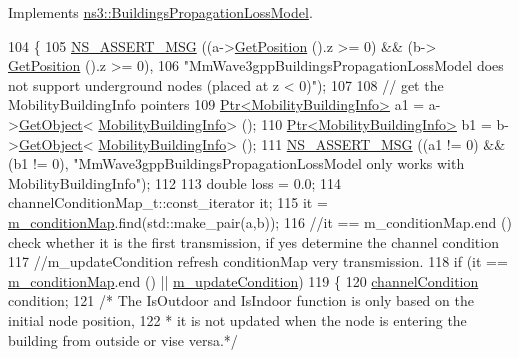 Implements \hyperlink{classns3_1_1BuildingsPropagationLossModel_a6d3a26e3118fdfd83253387f4360dc55}{ns3\+::\+Buildings\+Propagation\+Loss\+Model}.


\begin{DoxyCode}
104 \{
105         \hyperlink{assert_8h_aff5ece9066c74e681e74999856f08539}{NS\_ASSERT\_MSG} ((a->\hyperlink{classns3_1_1MobilityModel_aba838f06ec5bbb2d193d94b8c0e4abb4}{GetPosition} ().z >= 0) && (b->
      \hyperlink{classns3_1_1MobilityModel_aba838f06ec5bbb2d193d94b8c0e4abb4}{GetPosition} ().z >= 0),
106                         \textcolor{stringliteral}{"MmWave3gppBuildingsPropagationLossModel does not support underground nodes (placed
       at z < 0)"});
107 
108         \textcolor{comment}{// get the MobilityBuildingInfo pointers}
109         \hyperlink{classns3_1_1Ptr}{Ptr<MobilityBuildingInfo>} a1 = a->\hyperlink{classns3_1_1Object_a13e18c00017096c8381eb651d5bd0783}{GetObject}<
      \hyperlink{classns3_1_1MobilityBuildingInfo}{MobilityBuildingInfo}> ();
110         \hyperlink{classns3_1_1Ptr}{Ptr<MobilityBuildingInfo>} b1 = b->\hyperlink{classns3_1_1Object_a13e18c00017096c8381eb651d5bd0783}{GetObject}<
      \hyperlink{classns3_1_1MobilityBuildingInfo}{MobilityBuildingInfo}> ();
111         \hyperlink{assert_8h_aff5ece9066c74e681e74999856f08539}{NS\_ASSERT\_MSG} ((a1 != 0) && (b1 != 0), \textcolor{stringliteral}{"MmWave3gppBuildingsPropagationLossModel only
       works with MobilityBuildingInfo"});
112 
113         \textcolor{keywordtype}{double} loss = 0.0;
114         channelConditionMap\_t::const\_iterator it;
115         it = \hyperlink{classns3_1_1MmWave3gppBuildingsPropagationLossModel_a18b00c0130a2924ec13a7885543fc569}{m\_conditionMap}.find(std::make\_pair(a,b));
116         \textcolor{comment}{//it == m\_conditionMap.end () check whether it is the first transmission, if yes determine the
       channel condition}
117         \textcolor{comment}{//m\_updateCondition refresh conditionMap very transmission.}
118         \textcolor{keywordflow}{if} (it == \hyperlink{classns3_1_1MmWave3gppBuildingsPropagationLossModel_a18b00c0130a2924ec13a7885543fc569}{m\_conditionMap}.end () || \hyperlink{classns3_1_1MmWave3gppBuildingsPropagationLossModel_a2011a4d9cee62e274925719f9a9f4728}{m\_updateCondition})
119         \{
120                 \hyperlink{structchannelCondition}{channelCondition} condition;
121                 \textcolor{comment}{/* The IsOutdoor and IsIndoor function is only based on the initial node position,}
122 \textcolor{comment}{                 * it is not updated when the node is entering the building from outside or vise versa.*/}

\end{DoxyCode}
